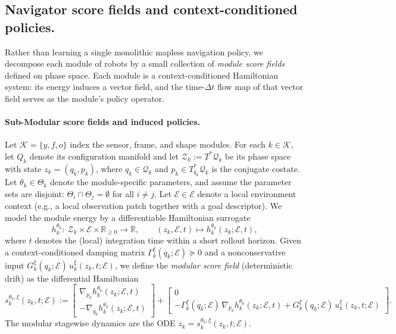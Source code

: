 \documentclass{article} %
\begin{document}
\subsection{Navigator score fields and context-conditioned policies.}
\label{subsec:modular_architecture}

Rather than learning a single monolithic mapless navigation policy, we decompose each module of robots by a small collection of
\emph{module score fields} defined on phase space. Each module is a context-conditioned Hamiltonian system: its energy
induces a vector field, and the time-$\Delta t$ flow map of that vector field serves as the module's policy operator.

\paragraph{Sub-Modular score fields and induced policies.}
Let $\mathcal K=\{y,f,o\}$ index the sensor, frame, and shape modules. For each $k\in\mathcal K$, let $Q_k$ denote its
configuration manifold and let $\mathcal Z_k:=T^*\mathcal{Q}_k$ be its phase space with state $z_k=(q_k,p_k)$, where
$q_k\in \mathcal{Q}_k$ and $p_k\in T^*_{q_k}\mathcal{Q}_k$ is the conjugate costate.
Let $\theta_k\in\Theta_k$ denote the module-specific parameters, and assume the parameter sets are disjoint:
$\Theta_i\cap\Theta_j=\emptyset$ for all $i\neq j$.
Let $\mathcal E\in\mathscr E$ denote a local environment context (e.g., a local observation patch together with a goal descriptor).
We model the module energy by a differentiable Hamiltonian surrogate
\[
 h_k^{\theta_k}:\ \mathcal Z_k\times\mathscr E\times\mathbb R_{\ge 0}\to\mathbb R,\qquad (z_k,\mathcal E,t)\mapsto h_k^{\theta_k}(z_k;\mathcal E,t),
\]
where $t$ denotes the (local) integration time within a short rollout horizon.
Given a context-conditioned damping matrix $\Gamma_k^{\xi}(q_k;\mathcal E)\succeq 0$ and a nonconservative input
$G_k^{\xi}(q_k;\mathcal E)\,u_k^{\xi}(z_k,t;\mathcal E)$, { we define the \emph{modular score field} (deterministic drift) as the differential Hamiltonian 
{\small
\begin{equation}
\label{eq:module_score_field}
 s_k^{\theta_k,\xi}(z_k,t;\mathcal E)
 \!:=\!
 \begin{bmatrix}
 \nabla_{p_k} h_k^{\theta_k}(z_k;\mathcal E,t)\\
 -\nabla_{q_k} h_k^{\theta_k}(z_k;\mathcal E,t)
 \end{bmatrix}
 \!+\!
 \begin{bmatrix}
 0\\
 -\Gamma_k^{\xi}(q_k;\mathcal E)\,\nabla_{p_k} h_k^{\theta_k}(z_k;\mathcal E,t)+G_k^{\xi}(q_k;\mathcal E)\,u_k^{\xi}(z_k,t;\mathcal E)
 \end{bmatrix}.
\end{equation}
}
The modular stagewise} dynamics are the ODE $\dot z_k=s_k^{\theta_k,\xi}(z_k,t;\mathcal E)$.
\end{document}
